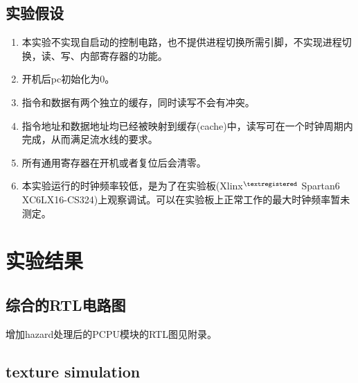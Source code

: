 \documentclass[10pt,a4paper,fleqn]{article}
\begin{document}
\subsection*{实验假设}
\begin{enumerate}
  \item 本实验不实现自启动的控制电路，也不提供进程切换所需引脚，不实现进程切换，读、写、内部寄存器的功能。
  \item 开机后pc初始化为0。
  \item 指令和数据有两个独立的缓存，同时读写不会有冲突。
  \item 指令地址和数据地址均已经被映射到缓存(cache)中，读写可在一个时钟周期内完成，从而满足流水线的要求。
  \item 所有通用寄存器在开机或者复位后会清零。
  \item 本实验运行的时钟频率较低，是为了在实验板(Xlinx$^{\textregistered}$ Spartan6 XC6LX16-CS324)上观察调试。可以在实验板上正常工作的最大时钟频率暂未测定。
\end{enumerate}

  \section{实验结果}
\subsection{综合的RTL电路图}
增加hazard处理后的PCPU模块的RTL图见附录。

\subsection{texture simulation}
\end{document}
